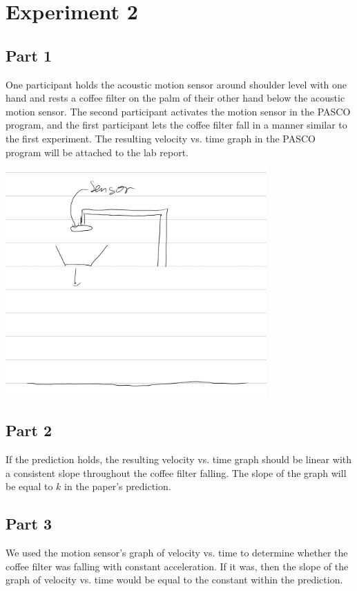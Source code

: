 \documentclass[8pt]{extarticle}
\begin{document}
{\section*{Experiment 2}
\subsection*{Part 1}
One participant holds the acoustic motion sensor around shoulder level with one hand and rests a coffee filter on the palm of their other hand below the acoustic motion sensor. The second participant activates the motion sensor in the PASCO program, and the first participant lets the coffee filter fall in a manner similar to the first experiment. The resulting velocity vs. time graph in the PASCO program will be attached to the lab report.
\begin{center}
	\includegraphics[width=10cm]{images/Lab6Image1_2.png}
\end{center}
\subsection*{Part 2}
If the prediction holds, the resulting velocity vs. time graph should be linear with a consistent slope throughout the coffee filter falling. The slope of the graph will be equal to $k$ in the paper's prediction.
\subsection*{Part 3}
We used the motion sensor's graph of velocity vs. time to determine whether the coffee filter was falling with constant acceleration. If it was, then the slope of the graph of velocity vs. time would be equal to the constant within the prediction.
}
\end{document}
